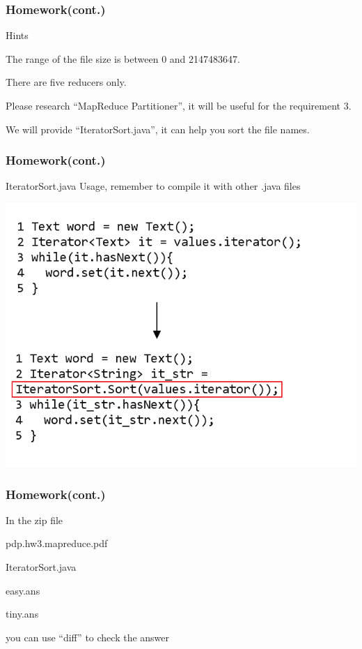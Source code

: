 \documentclass[12pt]{beamer}
\begin{document}
\begin{frame}
  \frametitle{Homework(cont.)}
  Hints
  \begin{itemize}
    {\item The range of the file size is between 0 and 2147483647.}
    {\item There are five reducers only.}
    {\item Please research ``MapReduce Partitioner'', it will be useful for the requirement 3.}
    {\item We will provide ``IteratorSort.java'', it can help you sort the file names.}
  \end{itemize}
\end{frame}

\begin{frame}
  \frametitle{Homework(cont.)}
  IteratorSort.java Usage, remember to compile it with other .java files
  \begin{center}
    \includegraphics[scale=0.4]{img/code.png}
  \end{center}
\end{frame}

\begin{frame}
  \frametitle{Homework(cont.)}
  In the zip file
  \begin{itemize}
    {\item pdp.hw3.mapreduce.pdf}
    {\item IteratorSort.java}
    {\item easy.ans}
    {\item tiny.ans}
  \end{itemize}
  you can use ``diff'' to check the answer
\end{frame}
\end{document}
